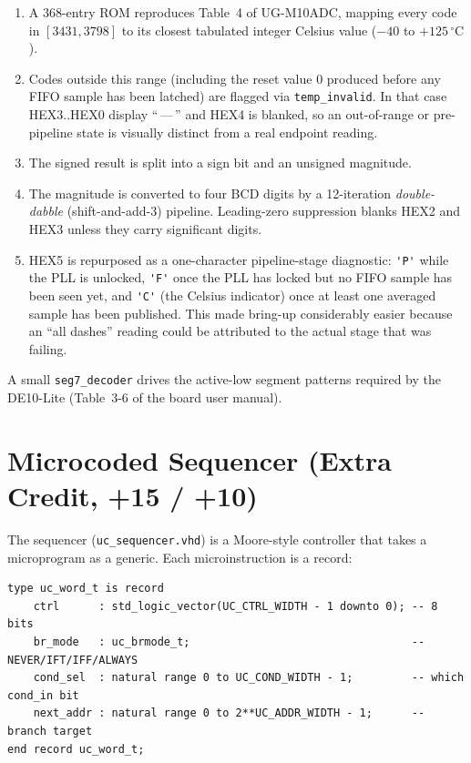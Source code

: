 \documentclass[12pt,letterpaper]{article}
\begin{document}
\begin{enumerate}
  \item A 368-entry ROM reproduces Table~4 of UG-M10ADC, mapping every code in
        \([3431, 3798]\) to its closest tabulated integer Celsius value
        (\(-40\) to \(+125\,^\circ\text{C}\)).
  \item Codes outside this range (including the reset value 0 produced before
        any FIFO sample has been latched) are flagged via \texttt{temp\_invalid}.
        In that case HEX3..HEX0 display ``\,---\,'' and HEX4 is blanked, so
        an out-of-range or pre-pipeline state is visually distinct from a real
        endpoint reading.
  \item The signed result is split into a sign bit and an unsigned magnitude.
  \item The magnitude is converted to four BCD digits by a 12-iteration
        \emph{double-dabble} (shift-and-add-3) pipeline.  Leading-zero
        suppression blanks HEX2 and HEX3 unless they carry significant digits.
  \item HEX5 is repurposed as a one-character pipeline-stage diagnostic:
        \verb|'P'| while the PLL is unlocked, \verb|'F'| once the PLL has locked but
        no FIFO sample has been seen yet, and \verb|'C'| (the Celsius indicator)
        once at least one averaged sample has been published.  This made
        bring-up considerably easier because an ``all dashes'' reading could
        be attributed to the actual stage that was failing.
\end{enumerate}

A small \texttt{seg7\_decoder} drives the active-low segment patterns required
by the DE10-Lite (Table~3-6 of the board user manual).

\section{Microcoded Sequencer (Extra Credit, +15 / +10)}
\label{sec:microcode}

The sequencer (\texttt{uc\_sequencer.vhd}) is a Moore-style controller that
takes a microprogram as a generic.  Each microinstruction is a record:

\begin{lstlisting}[caption={Microinstruction format (\texttt{uc\_pkg.vhd}).}]
type uc_word_t is record
    ctrl      : std_logic_vector(UC_CTRL_WIDTH - 1 downto 0); -- 8 bits
    br_mode   : uc_brmode_t;                                  -- NEVER/IFT/IFF/ALWAYS
    cond_sel  : natural range 0 to UC_COND_WIDTH - 1;         -- which cond_in bit
    next_addr : natural range 0 to 2**UC_ADDR_WIDTH - 1;      -- branch target
end record uc_word_t;
\end{lstlisting}
\end{document}
